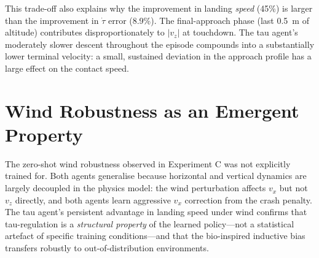 This trade-off also explains why the improvement in landing \emph{speed} (45\%) is
larger than the improvement in $\dot{\tau}$ error (8.9\%).
The final-approach phase (last 0.5~m of altitude) contributes disproportionately to
$|v_z|$ at touchdown.
The tau agent's moderately slower descent throughout the episode compounds into a
substantially lower terminal velocity: a small, sustained deviation in the
approach profile has a large effect on the contact speed.

\section{Wind Robustness as an Emergent Property}
\label{sec:anal_wind}

The zero-shot wind robustness observed in Experiment C was not explicitly trained for.
Both agents generalise because horizontal and vertical dynamics are largely decoupled in
the physics model: the wind perturbation affects $v_x$ but not $v_z$ directly, and
both agents learn aggressive $v_x$ correction from the crash penalty.
The tau agent's persistent advantage in landing speed under wind confirms that
tau-regulation is a \emph{structural property} of the learned policy---not a
statistical artefact of specific training conditions---and that the bio-inspired
inductive bias transfers robustly to out-of-distribution environments.
